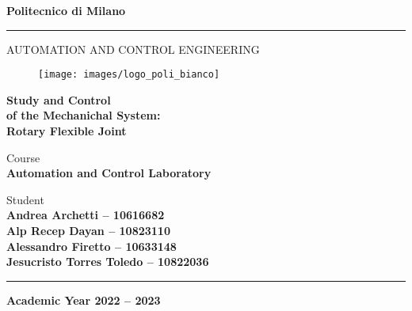 \documentclass[a4paper,12pt,openright,notitlepage,oneside]{book}
\begin{document}
	\begin{titlepage}

		\begin{center}
			\Large{\textbf{Politecnico di Milano}} \\
			\vspace{-4mm}
			\rule{\textwidth}{0.4pt}
			\normalsize{AUTOMATION AND CONTROL ENGINEERING} \\
			\vspace{24mm}
			
			\begin{figure}[h!]
				\centering
				\texttt{[image: images/logo\_poli\_bianco]}
			\end{figure}

			\vspace{25mm}

			\huge{\textbf{Study and Control}} \\
			\huge{\textbf{of the Mechanichal System:}} \\
			\huge{\textbf{Rotary Flexible Joint}} \\
			\vspace{15mm}
		\end{center}

		
		\begin{flushright}
			\normalsize{Course} \\
			\small{\textbf{Automation and Control Laboratory}} \\
		\end{flushright}

		\vspace{0.5mm}

		\begin{flushright}
			\normalsize{Student} \\
			\small{\textbf{Andrea Archetti -- 10616682}} \\
			\small{\textbf{Alp Recep Dayan -- 10823110}} \\
			\small{\textbf{Alessandro 	Firetto -- 10633148}} \\
			\small{\textbf{Jesucristo Torres Toledo -- 10822036}} \\
		\end{flushright}

		\begin{center}
			\rule{\textwidth}{0.4pt}
			\small{\textbf{Academic Year 2022 -- 2023}}
		\end{center}
	\end{titlepage}

	\mainmatter %

	\tableofcontents

	
	
	
	
	

	
\end{document}
